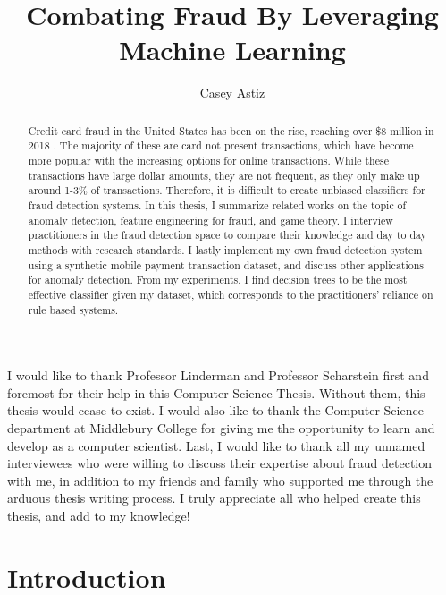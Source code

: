 \documentclass[midd]{thesis}
\title {Combating Fraud By Leveraging Machine Learning}
\author {Casey Astiz}
\begin{document}
\maketitle
{}

\begin{abstract}

Credit card fraud in the United States has been on the rise, reaching over \$8 million in 2018 \cite{USA}. The majority of these are card not present transactions, which have become more popular with the increasing options for online transactions. While these transactions have large dollar amounts, they are not frequent, as they only make up around 1-3\% of transactions. Therefore, it is difficult to create unbiased classifiers for fraud detection systems. In this thesis, I summarize related works on the topic of anomaly detection, feature engineering for fraud, and game theory. I interview practitioners in the fraud detection space to compare their knowledge and day to day methods with research standards. I lastly implement my own fraud detection system using a synthetic mobile payment transaction dataset, and discuss other applications for anomaly detection. From my experiments, I find decision trees to be the most effective classifier given my dataset, which corresponds to the practitioners' reliance on rule based systems.



\end{abstract}

\begin{acknowledgements}
I would like to thank Professor Linderman and Professor Scharstein first and foremost for their help in this Computer Science Thesis. Without them, this thesis would cease to exist. I would also like to thank the Computer Science department at Middlebury College for giving me the opportunity to learn and develop as a computer scientist. Last, I would like to thank all my unnamed interviewees who were willing to discuss their expertise about fraud detection with me, in addition to my friends and family who supported me through the arduous thesis writing process. I truly appreciate all who helped create this thesis, and add to my knowledge!

\end{acknowledgements}

\contentspage
\tablelistpage   
\figurelistpage

\normalspacing \setcounter{page}{1} 

\chapter{Introduction}
\label{sec:intro}
\end{document}

